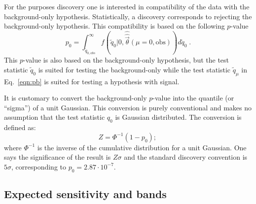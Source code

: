 For the purposes discovery one is interested in compatibility of the data with the background-only hypothesis.  Statistically, a discovery corresponds to rejecting the background-only hypothesis.  This compatibility is based on the following $p$-value
\begin{equation}
p_0=\int_{\tilde q_{0,obs}}^\infty f(\tilde q_0|0,\hat{\hat{\vec{\theta}}}(\mu=0,\textrm{obs}))d\tilde q_0 \;.
\end{equation}
This $p$-value is also based on the background-only hypothesis, but the test statistic $\tilde q_0$ is suited for testing the background-only while the test statistic $\tilde{q}_\mu$ in Eq.~\ref{eqn:pb} is suited for testing a hypothesis with signal.


It is customary to convert the background-only $p$-value into the quantile (or ``sigma'') of a unit Gaussian.  This conversion is purely conventional and makes no assumption that the test statistic $q_0$ is Gaussian distributed.  The conversion is defined as:
\begin{equation}
Z = \Phi^{-1}(1-p_0) ;\,
\end{equation}
where $\Phi^{-1}$ is the inverse of the cumulative distribution for a unit Gaussian.  One says the significance of the result is $Z\sigma$ and the standard discovery convention is $5\sigma$, corresponding to $p_0=2.87  \cdot 10^{-7}$.


\subsection{Expected sensitivity and bands}


